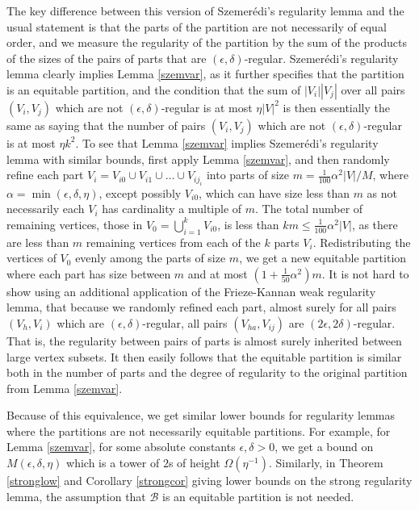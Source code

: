 \documentclass[11pt]{article}
\begin{document}
\begin{itemize}
The key difference between this version of Szemer\'edi's regularity lemma and
the usual statement is that the parts of the partition are not necessarily of
equal order, and we measure the regularity of the partition by the sum of the
products of the sizes of the pairs of parts that are
$(\epsilon,\delta)$-regular. Szemer\'edi's regularity lemma clearly implies
Lemma \ref{szemvar}, as
it further specifies that the partition is an equitable partition, and the
condition that the sum of $|V_i||V_j|$ over all pairs $(V_i,V_j)$ which are not
$(\epsilon,\delta)$-regular is at most $\eta |V|^2$ is then essentially the
same as saying that the number of pairs $(V_i,V_j)$ which are not
$(\epsilon,\delta)$-regular is at most $\eta k^2$. To see that Lemma
\ref{szemvar}
implies Szemer\'edi's regularity lemma with similar bounds, first apply Lemma
\ref{szemvar}, and then randomly refine each part $V_i=V_{i0} \cup V_{i1} \cup
\ldots \cup V_{ij_i}$ into parts of size $m=\frac{1}{100}\alpha^2 |V|/M$, where
$\alpha=\min(\epsilon,\delta,\eta)$, except possibly $V_{i0}$, which can have
size less than $m$ as not necessarily each $V_i$ has cardinality a multiple of
$m$. The total number of remaining vertices, those in $V_0= \bigcup_{i=1}^k
V_{i0}$, is less than $km\leq \frac{1}{100}\alpha^2|V|$, as there are less than
$m$ remaining vertices from each of the $k$ parts $V_i$. Redistributing the
vertices of $V_0$ evenly among the parts of size $m$, we get a new equitable
partition where each part has size between $m$ and at most
$(1+\frac{1}{50}\alpha^2)m$. It is not hard to show using an additional
application of the Frieze-Kannan weak regularity lemma, that because we
randomly refined each part, almost surely for all pairs $(V_h,V_i)$ which are
$(\epsilon,\delta)$-regular, all pairs $(V_{ha},V_{ij})$  are
$(2\epsilon,2\delta)$-regular. That is, the regularity between pairs of parts
is almost surely inherited between large vertex subsets. It then easily follows
that the equitable partition is similar both in the number of parts and the
degree of regularity to the original partition from Lemma \ref{szemvar}.

Because of this equivalence, we get similar lower bounds for regularity lemmas
where the partitions are not necessarily equitable partitions. For example, for
Lemma \ref{szemvar},  for some absolute constants $\epsilon,\delta>0$, we get a
bound on $M(\epsilon,\delta,\eta)$ which is a tower of $2$s of height
$\Omega(\eta^{-1})$. Similarly, in Theorem \ref{stronglow} and Corollary
\ref{strongcor} giving lower bounds on the strong regularity lemma, the
assumption that $\mathcal{B}$ is an equitable partition is not needed.


\end{itemize}
\end{document}
